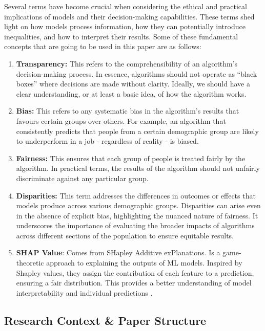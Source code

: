 \documentclass[twoside,11pt]{article}
\begin{document}
Several terms have become crucial when considering the ethical and practical implications of models and their decision-making capabilities. These terms shed light on how models process information, how they can potentially introduce inequalities, and how to interpret their results. Some of these fundamental concepts that are going to be used in this paper are as follows:

\begin{enumerate}
    \item \textbf{Transparency:} This refers to the comprehensibility of an algorithm's decision-making process. In essence, algorithms should not operate as ``black boxes'' where decisions are made without clarity. Ideally, we should have a clear understanding, or at least a basic idea, of how the algorithm works.
    
    \item \textbf{Bias:} This refers to any systematic bias in the algorithm's results that favours certain groups over others. For example, an algorithm that consistently predicts that people from a certain demographic group are likely to underperform in a job - regardless of reality - is biased.
    
    \item \textbf{Fairness:} This ensures that each group of people is treated fairly by the algorithm. In practical terms, the results of the algorithm should not unfairly discriminate against any particular group.

    \item \textbf{Disparities:} This term addresses the differences in outcomes or effects that models produce across various demographic groups. Disparities can arise even in the absence of explicit bias, highlighting the nuanced nature of fairness. It underscores the importance of evaluating the broader impacts of algorithms across different sections of the population to ensure equitable results.

    \item \textbf{SHAP Value}: Comes from SHapley Additive exPlanations. Is a game-theoretic approach to explaining the outputs of ML models. Inspired by Shapley values, they assign the contribution of each feature to a prediction, ensuring a fair distribution. This provides a better understanding of model interpretability and individual predictions .
\end{enumerate}

\subsection{Research Context \& Paper Structure}
\end{document}
